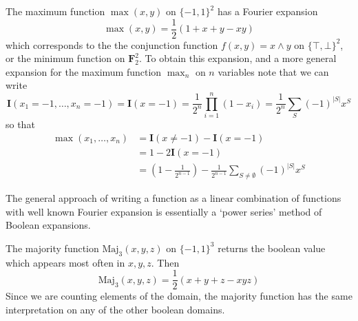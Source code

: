 \begin{example}
    The maximum function $\max(x,y)$ on $\{ -1, 1 \}^2$ has a Fourier expansion
    \[ \max(x,y) = \frac{1}{2} \left( 1 + x + y - xy \right) \]
    which corresponds to the the conjunction function $f(x,y) = x \wedge y$ on $\{ \top, \bot \}^2$, or the minimum function on $\mathbf{F}_2^2$. To obtain this expansion, and a more general expansion for the maximum function $\max_n$ on $n$ variables note that we can write
    \[ \mathbf{I}(x_1 = -1, \dots, x_n = -1) = \mathbf{I}(x = -1) = \frac{1}{2^n} \prod_{i = 1}^n (1 - x_i) = \frac{1}{2^n} \sum_S (-1)^{|S|} x^S \]
    so that
    \begin{align*}
        \max(x_1, \dots, x_n) &= \mathbf{I}(x \neq -1) - \mathbf{I}(x = -1)\\
        &= 1 - 2 \mathbf{I}(x = -1)\\
        &= \left(1 - \frac{1}{2^{n-1}} \right) - \frac{1}{2^{n-1}} \sum_{S \neq \emptyset} (-1)^{|S|} x^S
    \end{align*}
\end{example}

The general approach of writing a function as a linear combination of functions with well known Fourier expansion is essentially a `power series' method of Boolean expansions.

\begin{example}
    The majority function $\text{Maj}_3(x,y,z)$ on $\{ -1, 1 \}^3$ returns the boolean value which appears most often in $x,y,z$. Then
    \[ \text{Maj}_3(x,y,z) = \frac{1}{2} \left( x + y + z - xyz \right) \]
    Since we are counting elements of the domain, the majority function has the same interpretation on any of the other boolean domains.
\end{example}

